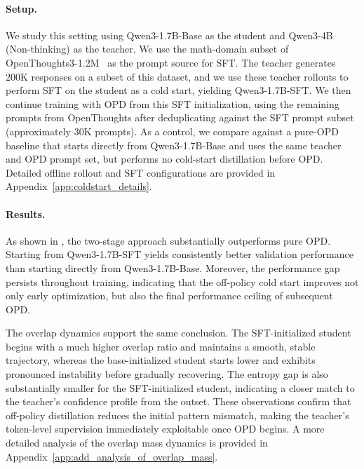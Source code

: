 \paragraph{Setup.}
We study this setting using Qwen3-1.7B-Base as the student and Qwen3-4B (Non-thinking) as the teacher.
We use the math-domain subset of OpenThoughts3-1.2M~\citep{guha2025openthoughts} as the prompt source for SFT.
The teacher generates 200K responses on a subset of this dataset, and we use these teacher rollouts to perform SFT on the student as a cold start, yielding Qwen3-1.7B-SFT.
We then continue training with OPD from this SFT initialization, using the remaining prompts from OpenThoughts after deduplicating against the SFT prompt subset (approximately 30K prompts).
As a control, we compare against a pure-OPD baseline that starts directly from Qwen3-1.7B-Base and uses the same teacher and OPD prompt set, but performs no cold-start distillation before OPD.
Detailed offline rollout and SFT configurations are provided in Appendix~\ref{app:coldstart_details}.


\paragraph{Results.}


As shown in , the two-stage approach substantially outperforms pure OPD. Starting from Qwen3-1.7B-SFT yields consistently better validation performance than starting directly from Qwen3-1.7B-Base. Moreover, the performance gap persists throughout training, indicating that the off-policy cold start improves not only early optimization, but also the final performance ceiling of subsequent OPD.

The overlap dynamics support the same conclusion. The SFT-initialized student begins with a much higher overlap ratio and maintains a smooth, stable trajectory, whereas the base-initialized student starts lower and exhibits pronounced instability before gradually recovering.
The entropy gap is also substantially smaller for the SFT-initialized student, indicating a closer match to the teacher's confidence profile from the outset.
These observations confirm that off-policy distillation reduces the initial pattern mismatch, making the teacher's token-level supervision immediately exploitable once OPD begins.
A more detailed analysis of the overlap mass dynamics is provided in Appendix~\ref{app:add_analysis_of_overlap_mass}.





